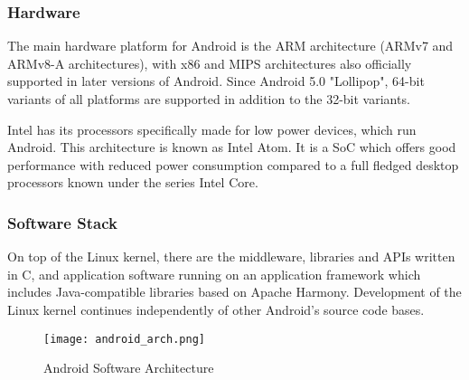 \subsubsection {Hardware}

The main hardware platform for Android is the ARM architecture (ARMv7 and ARMv8-A architectures),
with x86 and MIPS architectures also officially supported in later versions of Android.
Since Android 5.0 "Lollipop", 64-bit variants of all platforms are supported in
addition to the 32-bit variants.

Intel has its processors specifically made for low power devices, which run Android.
This architecture is known as Intel Atom. It is a SoC which offers good performance with
reduced power consumption compared to a full fledged desktop processors known under
the series Intel Core.

\subsubsection{Software Stack}

On top of the Linux kernel, there are the middleware, libraries and APIs written in C,
and application software running on an application framework which includes
Java-compatible libraries based on Apache Harmony. Development of the Linux kernel
continues independently of other Android's source code bases.

\begin{figure}[h]
  \centering
    \centering
    \texttt{[image: android\_arch.png]}
    \caption{Android Software Architecture}
    \label{fig:android_arch}
\end{figure}




  
  

